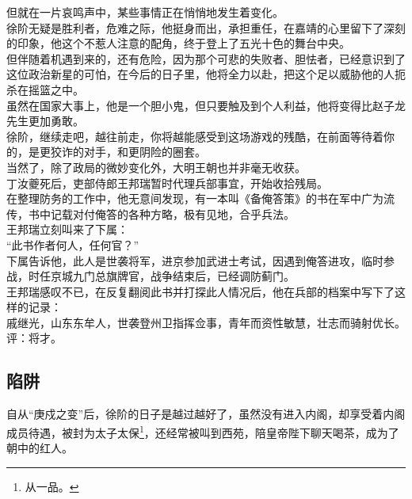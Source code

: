\begin{multicols}{\theparacolNo}
但就在一片哀鸣声中，某些事情正在悄悄地发生着变化。\\

徐阶无疑是胜利者，危难之际，他挺身而出，承担重任，在嘉靖的心里留下了深刻的印象，他这个不惹人注意的配角，终于登上了五光十色的舞台中央。\\

但伴随着机遇到来的，还有危险，因为那个可悲的失败者、胆怯者，已经意识到了这位政治新星的可怕，在今后的日子里，他将全力以赴，把这个足以威胁他的人扼杀在摇篮之中。\\

虽然在国家大事上，他是一个胆小鬼，但只要触及到个人利益，他将变得比赵子龙先生更加勇敢。\\

徐阶，继续走吧，越往前走，你将越能感受到这场游戏的残酷，在前面等待着你的，是更狡诈的对手，和更阴险的圈套。\\

当然了，除了政局的微妙变化外，大明王朝也并非毫无收获。\\

丁汝夔死后，吏部侍郎王邦瑞暂时代理兵部事宜，开始收拾残局。\\

在整理防务的工作中，他无意间发现，有一本叫《备俺答策》的书在军中广为流传，书中记载对付俺答的各种方略，极有见地，合乎兵法。\\

王邦瑞立刻叫来了下属：\\

“此书作者何人，任何官？”\\

下属告诉他，此人是世袭将军，进京参加武进士考试，因遇到俺答进攻，临时参战，时任京城九门总旗牌官，战争结束后，已经调防蓟门。\\

王邦瑞感叹不已，在反复翻阅此书并打探此人情况后，他在兵部的档案中写下了这样的记录：\\

戚继光，山东东牟人，世袭登州卫指挥佥事，青年而资性敏慧，壮志而骑射优长。评：将才。\\

\subsection{陷阱}
自从“庚戍之变”后，徐阶的日子是越过越好了，虽然没有进入内阁，却享受着内阁成员待遇，被封为太子太保\footnote{从一品。}，还经常被叫到西苑，陪皇帝陛下聊天喝茶，成为了朝中的红人。\\


\end{multicols}
